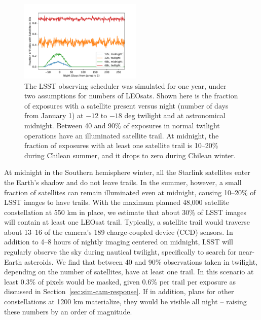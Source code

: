 \documentclass[twocolumn,trackchanges]{aastex63}
\begin{document}
\begin{figure}[ht!]
\includegraphics[trim=+1cm 0 0 0, width=0.52\textwidth]{frac_with_sats.pdf}
\caption{The LSST observing scheduler was simulated for one year, under two assumptions for numbers of LEOsats.
Shown here is the fraction of exposures with a satellite present versus night (number of days from January 1) at $-12$ to $-18$ deg twilight and at astronomical midnight.
Between 40 and 90\% of exposures in normal twilight operations have an illuminated satellite trail. At midnight, the fraction of exposures with at least one satellite trail is 10--20\% during Chilean summer, and it drops to zero during Chilean winter.  
\label{fig:expfraction}}
\end{figure}




At midnight in the Southern hemisphere winter, all the Starlink satellites enter the Earth's shadow and do not leave trails. In the summer, however, a small fraction of satellites can remain illuminated even at midnight, causing 10--20\% of LSST images to have trails. With the maximum planned 48,000 satellite constellation at 550 km in place, we estimate that about 30\% of LSST images will contain at least one LEOsat trail. Typically, a satellite trail would traverse about 13--16 of the camera's 189 charge-coupled device (CCD) sensors. 
In addition to 4--8 hours of nightly imaging centered on midnight, LSST will regularly observe the sky during nautical twilight, specifically to search for near-Earth asteroids. We find that between 40 and 90\% observations taken in twilight, depending on the number of satellites, have at least one trail. In this scenario at least 0.3\% of pixels would be masked, given 0.6\% per trail per exposure as discussed in Section~\ref{sec:sim-cam-response}. 
If in addition, plans for other constellations at 1200 km materialize, they would be visible all night -- raising these numbers by an order of magnitude.  %
 
\end{document}
